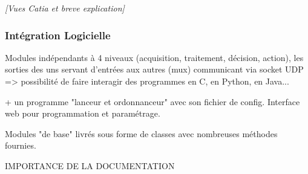			\textit{[Vues Catia et breve explication]}

	\subsubsection{Intégration Logicielle}

\begin{itshape}
Modules indépendants à 4 niveaux (acquisition, traitement, décision, action), les sorties des uns servant d'entrées aux autres (mux) communicant via socket UDP => possibilité de faire interagir des programmes en C, en Python, en Java... 

+ un programme "lanceur et ordonnanceur" avec son fichier de config. Interface web pour programmation et paramétrage.

Modules "de base" livrés sous forme de classes avec nombreuses méthodes fournies.

IMPORTANCE DE LA DOCUMENTATION

\end{itshape}